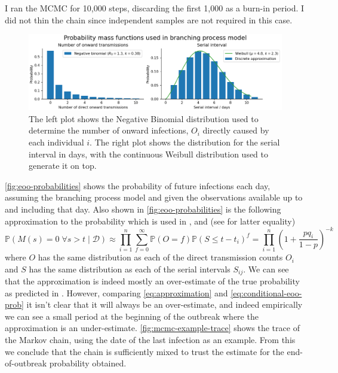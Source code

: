 \documentclass{article}
\begin{document}
I ran the MCMC for 10,000 steps, discarding the first 1,000 as a burn-in period. I did not thin the chain since independent samples are not required in this case.

\begin{figure}[p]
    \centering
    \includegraphics[width=\textwidth]{taiwan-model-distributions.png}
    \caption{The left plot shows the Negative Binomial distribution used to determine the number of onward infections, \(O_i\) directly caused by each individual \(i\). The right plot shows the distribution for the serial interval in days, with the continuous Weibull distribution used to generate it on top.}
    \label{fig:model-distributions}
\end{figure}

\autoref{fig:eoo-probabilities} shows the probability of future infections each day, assuming the branching process model and given the observations available up to and including that day.
Also shown in \autoref{fig:eoo-probabilities} is the following approximation to the probability which is used in \cite{Akhmetzhanov2021}, \cite{Linton2021} and \cite{Nishiura2016} (see  for latter equality)
\begin{equation}\label{eq:approximation}
\mathbb{P}(M(s) = 0 \;\forall s > t \;|\; \mathcal{D}) \approx \prod_{i=1}^n \sum_{f=0}^\infty \mathbb{P}(O = f) \mathbb{P}(S \leq t-t_i)^f = \prod_{i=1}^n \left(1 + \frac{pq_i}{1-p}\right)^{-k}
\end{equation}
where \(O\) has the same distribution as each of the direct transmission counts \(O_i\) and \(S\) has the same distribution as each of the serial intervals \(S_{ij}\).
We can see that the approximation is indeed mostly an over-estimate of the true probability as predicted in \cite{Nishiura2016}. However, comparing \autoref{eq:approximation} and \autoref{eq:conditional-eoo-prob} it isn't clear that it will always be an over-estimate, and indeed empirically we can see a small period at the beginning of the outbreak where the approximation is an under-estimate.
\autoref{fig:mcmc-example-trace} shows the trace of the Markov chain, using the date of the last infection as an example. From this we conclude that the chain is sufficiently mixed to trust the estimate for the end-of-outbreak probability obtained.
\end{document}
